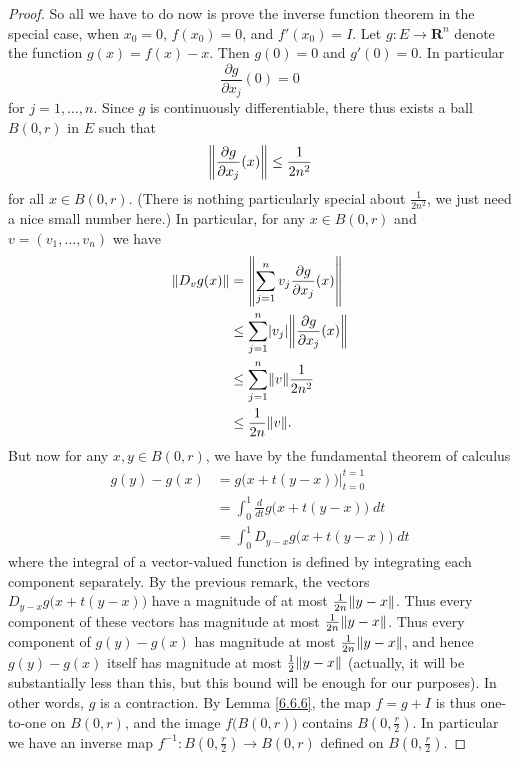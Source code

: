 \begin{proof}
    So all we have to do now is prove the inverse function theorem in the special case, when \(x_0 = 0\), \(f(x_0) = 0\), and \(f'(x_0) = I\).
    Let \(g : E \to \mathbf{R}^n\) denote the function \(g(x) = f(x) - x\).
    Then \(g(0) = 0\) and \(g'(0) = 0\).
    In particular
    \[
        \frac{\partial g}{\partial x_j}(0) = 0
    \]
    for \(j = 1, \dots, n\).
    Since \(g\) is continuously differentiable, there thus exists a ball \(B(0, r)\) in \(E\) such that
    \[
        \norm*{\frac{\partial g}{\partial x_j}(x)} \leq \frac{1}{2 n^2}
    \]
    for all \(x \in B(0, r)\).
    (There is nothing particularly special about \(\frac{1}{2 n^2}\), we just need a nice small number here.)
    In particular, for any \(x \in B(0, r)\) and \(v = (v_1, \dots, v_n)\) we have
    \begin{align*}
        \norm*{D_v g(x)} & = \norm*{\sum_{j = 1}^n v_j \frac{\partial g}{\partial x_j} (x)}          \\
                         & \leq \sum_{j = 1}^n \abs*{v_j} \norm*{\frac{\partial g}{\partial x_j}(x)} \\
                         & \leq \sum_{j = 1}^n \norm*{v} \frac{1}{2 n^2}                             \\
                         & \leq \frac{1}{2n} \norm*{v}.
    \end{align*}
    But now for any \(x, y \in B(0, r)\), we have by the fundamental theorem of calculus
    \begin{align*}
        g(y) - g(x) & = g\big(x + t(y - x)\big) \big|_{t = 0}^{t = 1}       \\
                    & = \int_0^1 \frac{d}{dt} g\big(x + t(y - x)\big) \; dt \\
                    & = \int_0^1 D_{y - x} g\big(x + t(y - x)\big) \; dt
    \end{align*}
    where the integral of a vector-valued function is defined by integrating each component separately.
    By the previous remark, the vectors \(D_{y - x} g\big(x + t(y - x)\big)\) have a magnitude of at most \(\frac{1}{2n} \norm*{y - x}\).
    Thus every component of these vectors has magnitude at most \(\frac{1}{2n} \norm*{y - x}\).
    Thus every component of \(g(y) - g(x)\) has magnitude at most \(\frac{1}{2n} \norm*{y - x}\), and hence \(g(y) - g(x)\) itself has magnitude at most \(\frac{1}{2} \norm*{y - x}\)
    (actually, it will be substantially less than this, but this bound will be enough for our purposes).
    In other words, \(g\) is a contraction.
    By Lemma \ref{6.6.6}, the map \(f = g + I\) is thus one-to-one on \(B(0, r)\), and the image \(f\big(B(0, r)\big)\) contains \(B(0, \frac{r}{2})\).
    In particular we have an inverse map \(f^{-1} : B(0, \frac{r}{2}) \to B(0, r)\) defined on \(B(0, \frac{r}{2})\).


\end{proof}
